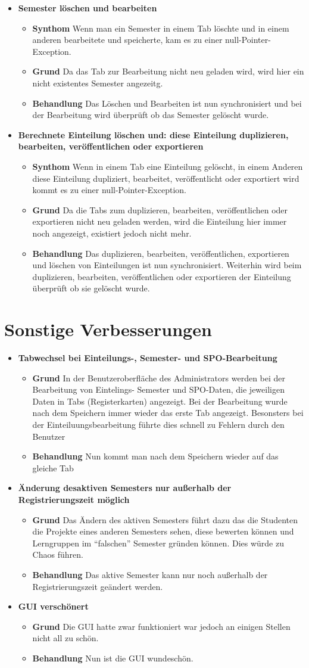 \documentclass[parskip=full]{scrartcl}
\newcommand{\fehler}[4]{\textbf{#1}
 							\begin{itemize}
 							  \item \textbf{Synthom}  #2
 							  \item \textbf{Grund} #3
 							  \item \textbf{Behandlung} #4
 							\end{itemize}}
\newcommand{\verbesserung}[3]{\textbf{#1}
 							\begin{itemize}
 							  
 							  \item \textbf{Grund} #2
 							  \item \textbf{Behandlung} #3
 							\end{itemize}}
\newcommand{\code}[1]{{\ttfamily #1}}
\begin{document}
\begin{itemize}
{    kann man das aktive Semester nun nur noch umstellen, wenn die
    Einteilungswarteschlange leer ist.}
    \item \fehler{Semester löschen und bearbeiten}{Wenn man ein Semester in
    einem Tab löschte und in einem anderen bearbeitete und speicherte, kam es zu
    einer \code{null}-Pointer-Exception. }{Da das Tab zur Bearbeitung nicht
    neu geladen wird, wird hier ein nicht existentes Semester angezeitg.}{Das
    Löschen und Bearbeiten ist nun synchronisiert und bei der Bearbeitung wird
    überprüft ob das Semester gelöscht wurde.}
    \item \fehler{Berechnete Einteilung löschen und: diese Einteilung
    duplizieren, bearbeiten, veröffentlichen oder exportieren}{Wenn in
    einem Tab eine Einteilung gelöscht, in einem Anderen diese Einteilung
    dupliziert, bearbeitet, veröffentlicht oder exportiert wird kommt es zu
    einer \code{null}-Pointer-Exception. }{Da die Tabs zum duplizieren,
    bearbeiten, veröffentlichen oder exportieren nicht neu geladen werden,
    wird die Einteilung hier immer noch angezeigt, existiert jedoch nicht
    mehr.}{Das duplizieren, bearbeiten, veröffentlichen, exportieren und
    löschen von Einteilungen ist nun synchronisiert. Weiterhin wird beim
    duplizieren, bearbeiten, veröffentlichen oder exportieren der Einteilung
    überprüft ob sie gelöscht wurde.}
\end{itemize}


\section{Sonstige Verbesserungen}

\begin{itemize}
\item \verbesserung{Tabwechsel bei Einteilungs-, Semester- und
SPO-Bearbeitung}{In der Benutzeroberfläche des Administrators werden bei der
Bearbeitung von Eintelings- Semester und SPO-Daten, die jeweiligen Daten in
Tabs (Registerkarten) angezeigt. Bei der Bearbeitung wurde nach dem Speichern
immer wieder das erste Tab angezeigt. Besonsters bei der
Einteiluungsbearbeitung führte dies schnell zu Fehlern durch den Benutzer}{Nun
kommt man nach dem Speichern wieder auf das gleiche Tab}
\item \verbesserung{Änderung desaktiven Semesters nur außerhalb der
Registrierungszeit möglich}{Das Ändern des aktiven Semesters führt dazu das
die Studenten die Projekte eines anderen Semesters sehen, diese bewerten
können und Lerngruppen im \enquote{falschen} Semester gründen können. Dies
würde zu Chaos führen.}{Das aktive Semester kann nur noch außerhalb der
Registrierungszeit geändert werden.}
\item \verbesserung{GUI verschönert}{Die GUI hatte zwar funktioniert war
jedoch an einigen Stellen nicht all zu schön.}{Nun ist die GUI wundeschön.}%
\end{itemize}
\end{document}
